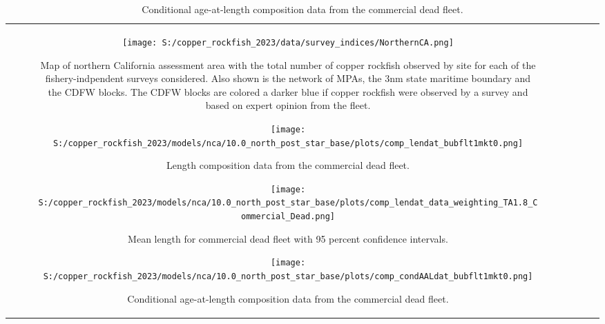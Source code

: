 \documentclass[11pt,
  letterpaper,
]{article}
\begin{document}
\begin{longtable}[t]{c>{\centering\arraybackslash}p{2cm}>{\centering\arraybackslash}p{2cm}>{\centering\arraybackslash}p{2cm}}
\begin{figure}
{\centering
\texttt{[image: S:/copper\_rockfish\_2023/data/survey\_indices/NorthernCA.png]}
}
\caption{Map of northern California assessment area with the total number of copper rockfish observed by site for each of the fishery-indpendent surveys considered. Also shown is the network of MPAs, the 3nm state maritime boundary and the CDFW blocks. The CDFW blocks are colored a darker blue if copper rockfish were observed by a survey and based on expert opinion from the fleet.\label{fig:survey-map}}
\end{figure}

\begin{figure}
{\centering
\texttt{[image: S:/copper\_rockfish\_2023/models/nca/10.0\_north\_post\_star\_base/plots/comp\_lendat\_bubflt1mkt0.png]}
}
\caption{Length composition data from the commercial dead fleet.\label{fig:com-dead-len-data}}
\end{figure}

\begin{figure}
{\centering
\texttt{[image: S:/copper\_rockfish\_2023/models/nca/10.0\_north\_post\_star\_base/plots/comp\_lendat\_data\_weighting\_TA1.8\_Commercial\_Dead.png]}
}
\caption{Mean length for commercial dead fleet with 95 percent confidence intervals.\label{fig:mean-com-dead-len-data}}
\end{figure}

\begin{figure}
{\centering
\texttt{[image: S:/copper\_rockfish\_2023/models/nca/10.0\_north\_post\_star\_base/plots/comp\_condAALdat\_bubflt1mkt0.png]}
}
\caption{Conditional age-at-length composition data from the commercial dead fleet.\label{fig:com-dead-age-data}}
\end{figure}


\end{longtable}
\end{document}
